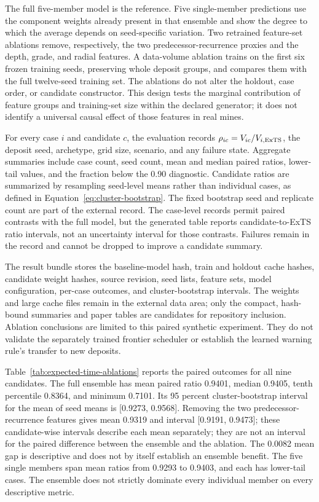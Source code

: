 \documentclass[11pt]{article}
\begin{document}
The full five-member model is the reference. Five single-member predictions use the component weights already present in that ensemble and show the degree to which the average depends on seed-specific variation. Two retrained feature-set ablations remove, respectively, the two predecessor-recurrence proxies and the depth, grade, and radial features. A data-volume ablation trains on the first six frozen training seeds, preserving whole deposit groups, and compares them with the full twelve-seed training set. The ablations do not alter the holdout, case order, or candidate constructor. This design tests the marginal contribution of feature groups and training-set size within the declared generator; it does not identify a universal causal effect of those features in real mines.

For every case $i$ and candidate $c$, the evaluation records $\rho_{ic}=V_{ic}/V_{i,\rm ExTS}$, the deposit seed, archetype, grid size, scenario, and any failure state. Aggregate summaries include case count, seed count, mean and median paired ratios, lower-tail values, and the fraction below the 0.90 diagnostic. Candidate ratios are summarized by resampling seed-level means rather than individual cases, as defined in Equation~\ref{eq:cluster-bootstrap}. The fixed bootstrap seed and replicate count are part of the external record. The case-level records permit paired contrasts with the full model, but the generated table reports candidate-to-ExTS ratio intervals, not an uncertainty interval for those contrasts. Failures remain in the record and cannot be dropped to improve a candidate summary.

The result bundle stores the baseline-model hash, train and holdout cache hashes, candidate weight hashes, source revision, seed lists, feature sets, model configuration, per-case outcomes, and cluster-bootstrap intervals. The weights and large cache files remain in the external data area; only the compact, hash-bound summaries and paper tables are candidates for repository inclusion. Ablation conclusions are limited to this paired synthetic experiment. They do not validate the separately trained frontier scheduler or establish the learned warning rule's transfer to new deposits.

Table~\ref{tab:expected-time-ablations} reports the paired outcomes for all nine candidates. The full ensemble has mean paired ratio 0.9401, median 0.9405, tenth percentile 0.8364, and minimum 0.7101. Its 95 percent cluster-bootstrap interval for the mean of seed means is [0.9273, 0.9568]. Removing the two predecessor-recurrence features gives mean 0.9319 and interval [0.9191, 0.9473]; these candidate-wise intervals describe each mean separately; they are not an interval for the paired difference between the ensemble and the ablation. The 0.0082 mean gap is descriptive and does not by itself establish an ensemble benefit. The five single members span mean ratios from 0.9293 to 0.9403, and each has lower-tail cases. The ensemble does not strictly dominate every individual member on every descriptive metric.
\end{document}

